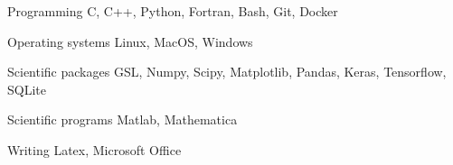 

\begin{cvskills}

    \cvskill
        {Programming} %
        {C, C++, Python, Fortran, Bash, Git, Docker} %

    \cvskill
        {Operating systems} %
        {Linux, MacOS, Windows} %

    \cvskill
        {Scientific packages} %
        {GSL, Numpy, Scipy, Matplotlib, Pandas, Keras, Tensorflow, SQLite} %

    \cvskill
        {Scientific programs} %
        {Matlab, Mathematica} %


    \cvskill
        {Writing} %
        {Latex, Microsoft Office} %

\end{cvskills}